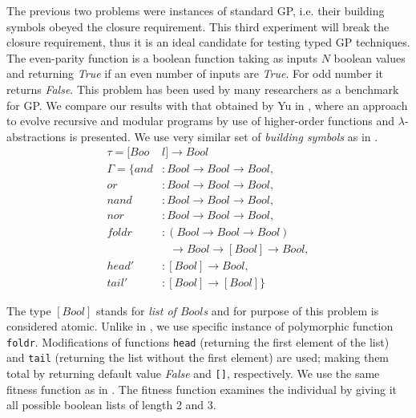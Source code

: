 \documentclass[conference]{IEEEtran}
\newcommand{\ar}{\rightarrow\xspace}
\begin{document}
The previous two problems were instances of standard GP, i.e. their building 
symbols obeyed the closure requirement. This third experiment will 
break the closure requirement, thus it is an ideal candidate for testing typed GP techniques. 
The even-parity function is a boolean function taking as inputs $N$
boolean values and returning \textit{True} if an even number of inputs 
are \textit{True}. For odd number it returns \textit{False}.
This problem has been used by many researchers
as a benchmark for GP. We compare our results with 
that obtained by Yu in \cite{yu01},
where an approach to evolve recursive and modular programs
by use of higher-order functions and $\lambda$-abstractions is presented.
We use very similar set of \textit{building symbols} as in \cite{yu01}. 
\begin{align*}
\tau = [Boo&l] \ar Bool\\
\Gamma = \{
  and   &: Bool \ar Bool \ar Bool                              ,\\
  or    &: Bool \ar Bool \ar Bool                              ,\\
  nand  &: Bool \ar Bool \ar Bool                              ,\\
  nor   &: Bool \ar Bool \ar Bool                              ,\\
  foldr &: (Bool \ar Bool \ar Bool) \\
        &~~~\ar Bool \ar [Bool] \ar Bool ,\\
  head' &: [Bool] \ar Bool                                   ,\\
  tail' &: [Bool] \ar [Bool]                              \}
\end{align*}

The type $[Bool]$ stands for \textit{list of $Bool$s} and for purpose of
this problem is considered atomic.
Unlike in \cite{yu01}, we use specific instance of polymorphic 
function \texttt{foldr}. 
Modifications of functions \texttt{head} 
(returning the first element of the list) 
and \texttt{tail} (returning the list without the first element) are used; 
making them total by returning default value \textit{False}
and \texttt{[]}, respectively.
We use the same fitness function as in \cite{yu01}. 
The fitness function examines the individual by giving
it all possible boolean lists of length 2 and 3.
\end{document}
